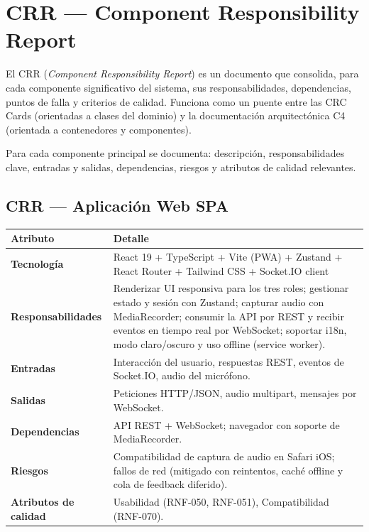 
\chapter{CRR --- Component Responsibility Report}

El CRR (\textit{Component Responsibility Report}) es un documento que consolida, para cada componente significativo del sistema, sus responsabilidades, dependencias, puntos de falla y criterios de calidad. Funciona como un puente entre las CRC Cards (orientadas a clases del dominio) y la documentación arquitectónica C4 (orientada a contenedores y componentes).

Para cada componente principal se documenta: descripción, responsabilidades clave, entradas y salidas, dependencias, riesgos y atributos de calidad relevantes.

\newcommand{\crrrow}[2]{%
  \textbf{\color{fmAccent}#1} & #2 \\
}

\section{CRR --- Aplicación Web SPA}

\begin{tabularx}{\textwidth}{>{\bfseries}L{3.5cm} X}
  \toprule
  \textbf{\color{fmAccent}Atributo} & \textbf{\color{fmAccent}Detalle} \\
  \midrule
  Tecnología & React 19 + TypeScript + Vite (PWA) + Zustand + React Router + Tailwind CSS + Socket.IO client \\
  Responsabilidades & Renderizar UI responsiva para los tres roles; gestionar estado y sesión con Zustand; capturar audio con MediaRecorder; consumir la API por REST y recibir eventos en tiempo real por WebSocket; soportar i18n, modo claro/oscuro y uso offline (service worker). \\
  Entradas & Interacción del usuario, respuestas REST, eventos de Socket.IO, audio del micrófono. \\
  Salidas & Peticiones HTTP/JSON, audio multipart, mensajes por WebSocket. \\
  Dependencias & API REST + WebSocket; navegador con soporte de MediaRecorder. \\
  Riesgos & Compatibilidad de captura de audio en Safari iOS; fallos de red (mitigado con reintentos, caché offline y cola de feedback diferido). \\
  Atributos de calidad & Usabilidad (RNF-050, RNF-051), Compatibilidad (RNF-070). \\
  \bottomrule
\end{tabularx}

